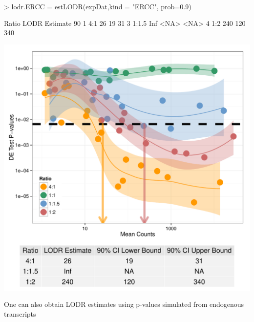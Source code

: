 \documentclass{article}
\begin{document}
\begin{center}
\begin{Schunk}
\begin{Sinput}
> lodr.ERCC = estLODR(expDat,kind = "ERCC", prob=0.9)
\end{Sinput}
\begin{Soutput}
  Ratio LODR Estimate 90%
1   4:1            26                 19                 31
3 1:1.5           Inf               <NA>               <NA>
4   1:2           240                120                340
\end{Soutput}
\end{Schunk}
\includegraphics{erccdashboardVignette-estLODRERCC}
\end{center}
One can also obtain LODR estimates using p-values simulated from endogenous transcripts
\end{document}
